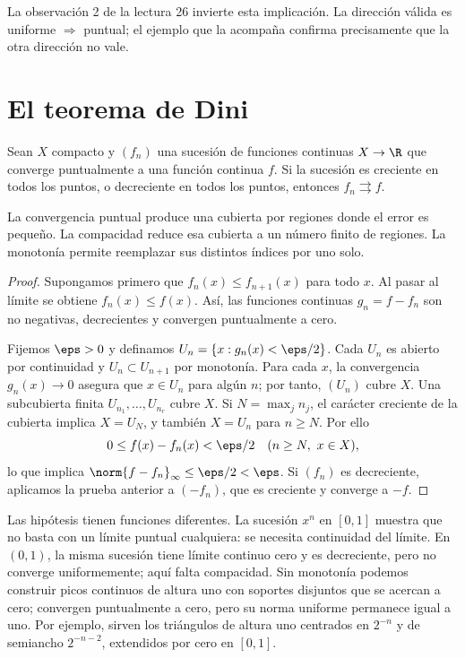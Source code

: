 \begin{observacion}
La observación 2 de la lectura 26 invierte esta implicación. La dirección válida es uniforme $\Rightarrow$ puntual; el ejemplo que la acompaña confirma precisamente que la otra dirección no vale.
\end{observacion}

\section{El teorema de Dini}
\begin{teorema}[Dini]\label{ch26:dini}
Sean $X$ compacto y $(f_n)$ una sucesión de funciones continuas $X\to\R$ que converge puntualmente a una función continua $f$. Si la sucesión es creciente en todos los puntos, o decreciente en todos los puntos, entonces $f_n\rightrightarrows f$.
\end{teorema}
\begin{estrategia}
La convergencia puntual produce una cubierta por regiones donde el error es pequeño. La compacidad reduce esa cubierta a un número finito de regiones. La monotonía permite reemplazar sus distintos índices por uno solo.
\end{estrategia}
\begin{proof}
Supongamos primero que $f_n(x)\le f_{n+1}(x)$ para todo $x$. Al pasar al límite se obtiene $f_n(x)\le f(x)$. Así, las funciones continuas $g_n=f-f_n$ son no negativas, decrecientes y convergen puntualmente a cero.

Fijemos $\eps>0$ y definamos $U_n=\{x:g_n(x)<\eps/2\}$. Cada $U_n$ es abierto por continuidad y $U_n\subset U_{n+1}$ por monotonía. Para cada $x$, la convergencia $g_n(x)\to0$ asegura que $x\in U_n$ para algún $n$; por tanto, $(U_n)$ cubre $X$. Una subcubierta finita $U_{n_1},\ldots,U_{n_r}$ cubre $X$. Si $N=\max_j n_j$, el carácter creciente de la cubierta implica $X=U_N$, y también $X=U_n$ para $n\ge N$. Por ello
\[
 0\le f(x)-f_n(x)<\eps/2\quad(n\ge N,\ x\in X),
\]
lo que implica $\norm{f-f_n}_\infty\le\eps/2<\eps$. Si $(f_n)$ es decreciente, aplicamos la prueba anterior a $(-f_n)$, que es creciente y converge a $-f$.
\end{proof}

Las hipótesis tienen funciones diferentes. La sucesión $x^n$ en $[0,1]$ muestra que no basta con un límite puntual cualquiera: se necesita continuidad del límite. En $(0,1)$, la misma sucesión tiene límite continuo cero y es decreciente, pero no converge uniformemente; aquí falta compacidad. Sin monotonía podemos construir picos continuos de altura uno con soportes disjuntos que se acercan a cero; convergen puntualmente a cero, pero su norma uniforme permanece igual a uno. Por ejemplo, sirven los triángulos de altura uno centrados en $2^{-n}$ y de semiancho $2^{-n-2}$, extendidos por cero en $[0,1]$.

